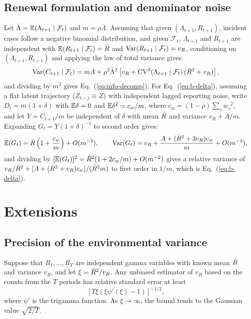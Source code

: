 \subsection{Renewal formulation and denominator noise}
\label{app:renewal}

Let $\bar{\Lambda}=\mathbb{E}(\Lambda_{t+1}\mid\mathcal{F}_t)$ and $m=\rho\bar{\Lambda}$. Assuming that given $(\Lambda_{t+1},R_{t+1})$, incident cases follow a negative binomial distribution, and given $\mathcal{F}_t$, $\Lambda_{t+1}$ and $R_{t+1}$ are independent with $\mathbb{E}(R_{t+1}\mid\mathcal{F}_t)=\bar{R}$ and $\mathrm{Var}(R_{t+1}\mid\mathcal{F}_t)=v_R$, conditioning on $(\Lambda_{t+1},R_{t+1})$ and applying the law of total variance gives:
\begin{equation}
  \mathrm{Var}(C_{t+1}\mid\mathcal{F}_t)=mA+\rho^2\bar{\Lambda}^2\left[v_R+\mathrm{CV}^2(\Lambda_{t+1}\mid\mathcal{F}_t)\,(\bar{R}^2+v_R)\right],
\end{equation}
and dividing by $m^2$ gives Eq.~(\ref{eq:info-decomp}). For Eq.~(\ref{eq:b-delta}), assuming a flat latent trajectory ($Z_{t-j}\equiv Z$) with independent lagged reporting noise, write $D_t=m(1+\delta)$ with $\mathbb{E}\delta=0$ and $\mathbb{E}\delta^2=c_w/m$, where $c_w=(1-\rho)\sum_sw_s{}^2$, and let $Y=C_{t+1}/m$ be independent of $\delta$ with mean $\bar{R}$ and variance $v_R+A/m$. Expanding $G_t=Y(1+\delta)^{-1}$ to second order gives:
\begin{equation}
  \mathbb{E}(G_t)=\bar{R}\left(1+\frac{c_w}{m}\right)+O(m^{-2}),\qquad
  \mathrm{Var}(G_t)=v_R+\frac{A+(\bar{R}^2+3v_R)c_w}{m}+O(m^{-2}),
\end{equation}
and dividing by $[\mathbb{E}(G_t)]^2=\bar{R}^2(1+2c_w/m)+O(m^{-2})$ gives a relative variance of $v_R/\bar{R}^2+[A+(\bar{R}^2+v_R)c_w]/(\bar{R}^2m)$ to first order in $1/m$, which is Eq.~(\ref{eq:b-delta}).

\section{Extensions}
\label{app:extensions}

\subsection{Precision of the environmental variance}
\label{app:vr-precision}

\begin{proposition}
\label{prop:vr-precision}
Suppose that $R_1,\dots,R_T$ are independent gamma variables with known mean $\bar{R}$ and variance $v_R$, and let $\xi=\bar{R}^2/v_R$. Any unbiased estimator of $v_R$ based on the counts from the $T$ periods has relative standard error at least
\begin{equation}
  \left[T\xi\left(\xi\psi'(\xi)-1\right)\right]^{-1/2},
  \label{eq:vr-bound}
\end{equation}
where $\psi'$ is the trigamma function. As $\xi\to\infty$, the bound tends to the Gaussian value $\sqrt{2/T}$.
\end{proposition}

